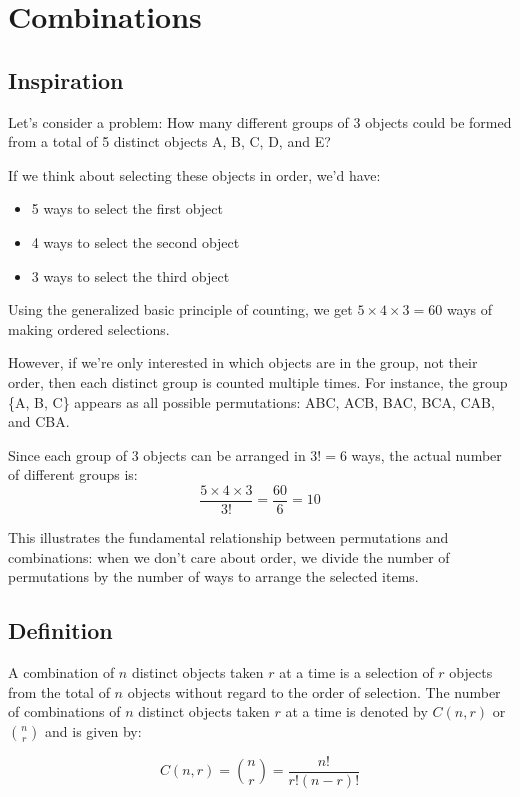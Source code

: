 \section{Combinations}
\subsection{Inspiration}

Let's consider a problem: How many different groups of 3 objects could be formed from a total of 5 distinct objects A, B, C, D, and E?

If we think about selecting these objects in order, we'd have:
\begin{itemize}
    \item 5 ways to select the first object
    \item 4 ways to select the second object
    \item 3 ways to select the third object
\end{itemize}

Using the generalized basic principle of counting, we get $5 \times 4 \times 3 = 60$ ways of making ordered selections.

However, if we're only interested in which objects are in the group, not their order, then each distinct group is counted multiple times. For instance, the group \{A, B, C\} appears as all possible permutations: ABC, ACB, BAC, BCA, CAB, and CBA.

Since each group of 3 objects can be arranged in $3! = 6$ ways, the actual number of different groups is:
\[ \frac{5 \times 4 \times 3}{3!} = \frac{60}{6} = 10 \]

This illustrates the fundamental relationship between permutations and combinations: when we don't care about order, we divide the number of permutations by the number of ways to arrange the selected items.
\subsection{Definition}
\begin{definitionboxbreak}{}
    A combination of \(n\) distinct objects taken \(r\) at a time is a selection of \(r\) objects from the total of \(n\) objects without regard to the order of selection. The number of combinations of \(n\) distinct objects taken \(r\) at a time is denoted by \(C(n,r)\) or \(\binom{n}{r}\) and is given by:
    
    \[
    C(n,r) = \binom{n}{r} = \frac{n!}{r!(n-r)!}
    \]
\end{definitionboxbreak}


